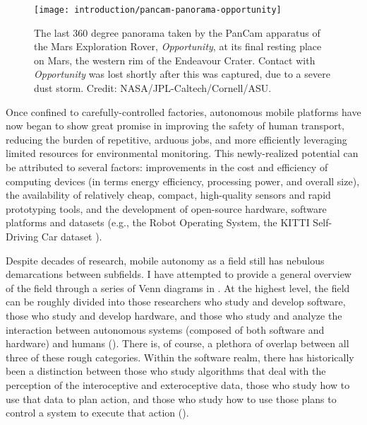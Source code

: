 \begin{figure}
  \begin{center}
  	\vspace{-10pt}
    \texttt{[image: introduction/pancam-panorama-opportunity]}
     \vspace{-15pt}
  \end{center}
  \caption{The last 360 degree panorama taken by the PanCam apparatus of the Mars Exploration Rover, \textit{Opportunity}, at its final resting place on Mars, the western rim of the Endeavour Crater. Contact with \textit{Opportunity} was lost shortly after this was captured, due to a severe dust storm. Credit: NASA/JPL-Caltech/Cornell/ASU.}
  \vspace{-5pt}
  \label{fig:into_rur}
\end{figure}


Once confined to carefully-controlled factories, autonomous mobile platforms have now began to show great promise in improving the safety of human transport, reducing the burden of repetitive, arduous jobs, and more efficiently leveraging limited resources for environmental monitoring. This newly-realized potential can be attributed to several factors: improvements in the cost and efficiency of computing devices (in terms energy efficiency, processing power, and overall size), the availability of relatively cheap, compact, high-quality sensors and rapid prototyping tools, and the development of open-source hardware, software platforms and datasets (e.g., the Robot Operating System, the KITTI Self-Driving Car dataset \citep{Geiger2013-ky}). 

 
 Despite decades of research, mobile autonomy as a field still has nebulous demarcations between subfields. I have attempted to provide a general overview of the field through a series of Venn diagrams in .  At the highest level, the field can be roughly divided into those researchers who study and develop software, those who study and develop hardware, and those who study and analyze the interaction between autonomous systems (composed of both software and hardware) and humans (). There is, of course, a plethora of overlap between all three of these rough categories. Within the software realm, there has historically been a distinction between those who study algorithms that deal with the perception of the interoceptive and exteroceptive data, those who study how to use that data to plan action, and those who study how to use those plans to control a system to execute that action (). 
 

